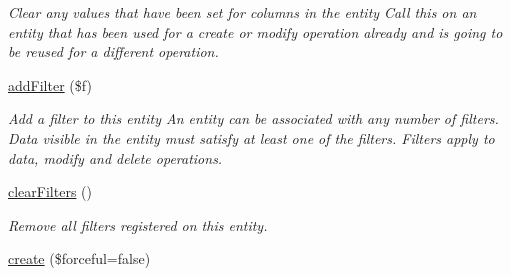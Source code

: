 \begin{DoxyCompactItemize}
\begin{DoxyCompactList}\small\item\em Clear any values that have been set for columns in the entity Call this on an entity that has been used for a create or modify operation already and is going to be reused for a different operation. \end{DoxyCompactList}\item 
\hyperlink{classentity_a7041812e724f4d4e92f7350ac1ca4730}{add\+Filter} (\$f)
\begin{DoxyCompactList}\small\item\em Add a filter to this entity An entity can be associated with any number of filters. Data visible in the entity must satisfy at least one of the filters. Filters apply to data, modify and delete operations. \end{DoxyCompactList}\item 
\hypertarget{classentity_a3c82e6e7a3a2c79306206db541d2a343}{}\hyperlink{classentity_a3c82e6e7a3a2c79306206db541d2a343}{clear\+Filters} ()\label{classentity_a3c82e6e7a3a2c79306206db541d2a343}

\begin{DoxyCompactList}\small\item\em Remove all filters registered on this entity. \end{DoxyCompactList}\item 
\hypertarget{classentity_aa093f16b8fa83dcba92779df20f8a53f}{}\hyperlink{classentity_aa093f16b8fa83dcba92779df20f8a53f}{create} (\$forceful=false)\label{classentity_aa093f16b8fa83dcba92779df20f8a53f}


\end{DoxyCompactItemize}

